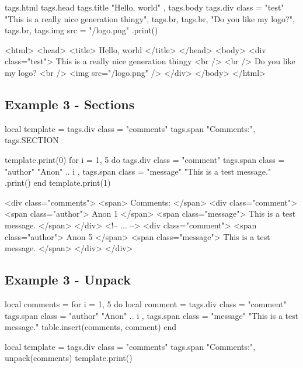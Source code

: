 \documentclass[a4paper,11pt]{report}
\begin{document}
\begin{lua}
tags.html
{
	tags.head
	{
		tags.title
		{
			"Hello, world"
		}
	},
	tags.body
	{
		tags.div {class = "test"}
		{
			"This is a really nice generation thingy",
			tags.br, tags.br,
			"Do you like my logo?",
			tags.br,
			tags.img {src = "/logo.png"}
		}
	}
}.print()
\end{lua}

\begin{html}
<html>
	<head>
		<title>
			Hello, world
		</title>
	</head>
	<body>
		<div class="test">
			This is a really nice generation thingy
			<br />
			<br />
			Do you like my logo?
			<br />
			<img src="/logo.png" />
		</div>
	</body>
</html>
\end{html}

\subsection{Example 3 - Sections}

\begin{lua}
local template = tags.div {class = "comments"}
{
	tags.span {"Comments:"},
	tags.SECTION
}

template.print(0)
for i = 1, 5 do
	tags.div {class = "comment"}
	{
		tags.span {class = "author"} { "Anon" .. i },
		tags.span {class = "message"} { "This is a test message." }
	}.print()
end
template.print(1)
\end{lua}

\begin{html}
<div class="comments">
	<span>
		Comments:
	</span>
	<div class="comment">
		<span class="author">
			Anon 1
		</span>
		<span class="message">
			This is a test message.
		</span>
	</div>
	<!-- ... -->
	<div class="comment">
		<span class="author">
			Anon 5
		</span>
		<span class="message">
			This is a test message.
		</span>
	</div>
</div>
\end{html}

\subsection{Example 3 - Unpack}

\begin{lua}
local comments = {}
for i = 1, 5 do
	local comment = tags.div {class = "comment"}
	{
		tags.span {class = "author"} { "Anon" .. i },
		tags.span {class = "message"} { "This is a test message." }
	}
	table.insert(comments, comment)
end

local template = tags.div {class = "comments"}
{
	tags.span {"Comments:"},
	unpack(comments)
}
template.print()
\end{lua}
\end{document}
